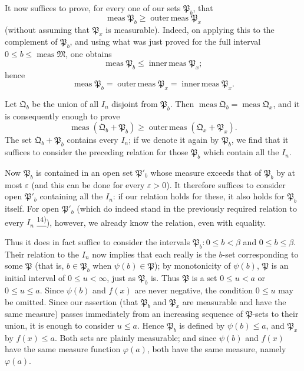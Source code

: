 \documentclass[12pt,b5paper,twoside]{article}
\newcommand{\noteref}[1]{%
  \hyperlink{note:#1}{\textsuperscript{#1)}}}
\begin{document}
It now suffices to prove, for every one of our sets $\mathfrak P_b$, that
\[
  \operatorname{meas}\mathfrak P_b
  \geq \operatorname{outer\,meas}\mathfrak P_x
\]
(without assuming that $\mathfrak P_x$ is measurable). Indeed, on applying this to the complement of $\mathfrak P_b$, and using what was just proved for the full interval $0\leq b\leq\operatorname{meas}\mathfrak M$, one obtains
\[
  \operatorname{meas}\mathfrak P_b
  \leq \operatorname{inner\,meas}\mathfrak P_x;
\]
hence
\[
  \operatorname{meas}\mathfrak P_b
  =\operatorname{outer\,meas}\mathfrak P_x
  =\operatorname{inner\,meas}\mathfrak P_x.
\]

Let $\mathfrak Q_b$ be the union of all $I_n$ disjoint from $\mathfrak P_b$. Then $\operatorname{meas}\mathfrak Q_b=\operatorname{meas}\mathfrak Q_x$, and it is consequently enough to prove
\[
 \operatorname{meas}(\mathfrak Q_b+\mathfrak P_b)
 \geq
 \operatorname{outer\,meas}(\mathfrak Q_x+\mathfrak P_x).
\]
The set $\mathfrak Q_b+\mathfrak P_b$ contains every $I_n$; if we denote it again by $\mathfrak P_b$, we find that it suffices to consider the preceding relation for those $\mathfrak P_b$ which contain all the $I_n$.

Now $\mathfrak P_b$ is contained in an open set $\mathfrak P'_b$ whose measure exceeds that of $\mathfrak P_b$ by at most $\varepsilon$ (and this can be done for every $\varepsilon>0$). It therefore suffices to consider open $\mathfrak P'_b$ containing all the $I_n$: if our relation holds for these, it also holds for $\mathfrak P_b$ itself. For open $\mathfrak P'_b$ (which do indeed stand in the previously required relation to every $I_n$\noteref{14}), however, we already know the relation, even with equality.

Thus it does in fact suffice to consider the intervals $\mathfrak P_b:0\leq b<\beta$ and $0\leq b\leq\beta$. Their relation to the $I_n$ now implies that each really is the $b$-set corresponding to some $\mathfrak P$ (that is, $b\in\mathfrak P_b$ when $\psi(b)\in\mathfrak P$); by monotonicity of $\psi(b)$, $\mathfrak P$ is an initial interval of $0\leq u<\infty$, just as $\mathfrak P_b$ is. Thus $\mathfrak P$ is a set $0\leq u<a$ or $0\leq u\leq a$. Since $\psi(b)$ and $f(x)$ are never negative, the condition $0\leq u$ may be omitted. Since our assertion (that $\mathfrak P_b$ and $\mathfrak P_x$ are measurable and have the same measure) passes immediately from an increasing sequence of $\mathfrak P$-sets to their union, it is enough to consider $u\leq a$. Hence $\mathfrak P_b$ is defined by $\psi(b)\leq a$, and $\mathfrak P_x$ by $f(x)\leq a$. Both sets are plainly measurable; and since $\psi(b)$ and $f(x)$ have the same measure function $\varphi(a)$, both have the same measure, namely $\varphi(a)$.
\end{document}
